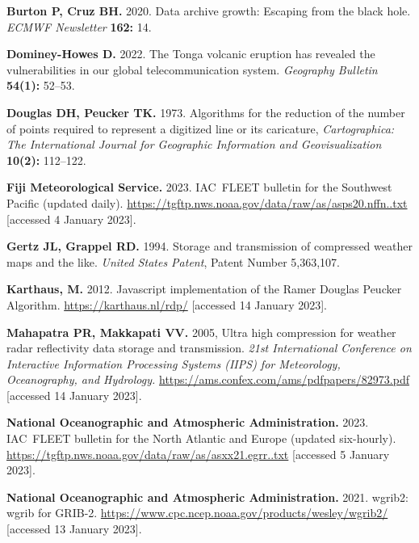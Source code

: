 \documentclass[12pt,a4paper]{article}
\begin{document}
\raggedright
\begin{thebibliography}{00}

\textbf{Burton P, Cruz BH.}
2020.
Data archive growth: Escaping from the black hole.
\textsl{ECMWF Newsletter} \textbf{162:} 14.

\textbf{Dominey-Howes D.}
2022.
The Tonga volcanic eruption has revealed the vulnerabilities in our global
telecommunication system.
\textsl{Geography Bulletin} \textbf{54(1):} 52--53.

\textbf{Douglas DH, Peucker TK.}
1973.
Algorithms for the reduction of the number of points
required to represent a digitized line or its caricature,
\textsl{Cartographica: The International Journal for Geographic Information and
Geovisualization} \textbf{10(2):} 112--122.

\textbf{Fiji Meteorological Service.}
2023.
IAC~FLEET bulletin for the Southwest Pacific (updated daily).
\url{https://tgftp.nws.noaa.gov/data/raw/as/asps20.nffn..txt}
[accessed 4 January 2023].

\textbf{Gertz JL, Grappel RD.}
1994.
Storage and transmission of compressed weather maps and the like.
\textsl{United States Patent}, Patent Number 5,363,107.

\textbf{Karthaus, M.}
2012.
Javascript implementation of the Ramer Douglas Peucker Algorithm.
\url{https://karthaus.nl/rdp/}
[accessed 14 January 2023].

\textbf{Mahapatra PR, Makkapati VV.}
2005,
Ultra high compression for weather radar reflectivity data storage and transmission.
\textsl{21st International Conference on Interactive Information Processing Systems (IIPS)
for Meteorology, Oceanography, and Hydrology.}
\url{https://ams.confex.com/ams/pdfpapers/82973.pdf}
[accessed 14 January 2023].

\textbf{National Oceanographic and Atmospheric Administration.}
2023.
IAC~FLEET bulletin for the North Atlantic and Europe (updated six-hourly).
\url{https://tgftp.nws.noaa.gov/data/raw/as/asxx21.egrr..txt} 
[accessed 5 January 2023].

\textbf{National Oceanographic and Atmospheric Administration.}
2021.
wgrib2: wgrib for GRIB-2.
\url{https://www.cpc.ncep.noaa.gov/products/wesley/wgrib2/}
[accessed 13 January 2023].


\end{thebibliography}
\end{document}
